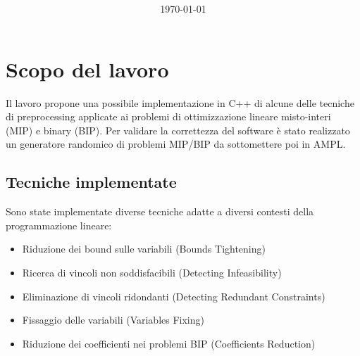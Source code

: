 \documentclass{article}
\title{
\vspace{2in}
\textmd{\textbf{\hmwkClass}}\\
\vspace{0.1in}\large{\textit{\hmwkUniversita}}
\vspace{3in}
}
\author{\textbf{\hmwkAuthorName}}
\date{\today} %
\begin{document}
\maketitle



\newpage
\tableofcontents
\newpage



\section{Scopo del lavoro}

Il lavoro propone una possibile implementazione in C++ di alcune delle tecniche di preprocessing applicate ai problemi di ottimizzazione lineare misto-interi (MIP) e binary (BIP). Per validare la correttezza del software è stato realizzato un generatore randomico di problemi MIP/BIP da sottomettere poi in AMPL. 

\subsection{Tecniche implementate}

Sono state implementate diverse tecniche adatte a diversi contesti della programmazione lineare:

\begin{itemize}
\item Riduzione dei bound sulle variabili (Bounds Tightening)
\item Ricerca di vincoli non soddisfacibili (Detecting Infeasibility)
\item Eliminazione di vincoli ridondanti (Detecting Redundant Constraints)
\item Fissaggio delle variabili (Variables Fixing)
\item Riduzione dei coefficienti nei problemi BIP (Coefficients Reduction)
\end{itemize}
\end{document}
